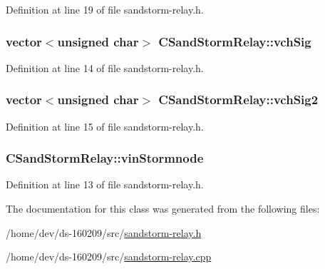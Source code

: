 Definition at line 19 of file sandstorm-\/relay.\+h.

\hypertarget{class_c_sand_storm_relay_a1e00147c64eddf291075d9a895894a98}{}
\subsubsection[{vch\+Sig}]{\setlength{\rightskip}{0pt plus 5cm}vector$<$unsigned char$>$ C\+Sand\+Storm\+Relay\+::vch\+Sig}\label{class_c_sand_storm_relay_a1e00147c64eddf291075d9a895894a98}


Definition at line 14 of file sandstorm-\/relay.\+h.

\hypertarget{class_c_sand_storm_relay_a5a9a84a315c1e649746bcbe1e5b85cb7}{}
\subsubsection[{vch\+Sig2}]{\setlength{\rightskip}{0pt plus 5cm}vector$<$unsigned char$>$ C\+Sand\+Storm\+Relay\+::vch\+Sig2}\label{class_c_sand_storm_relay_a5a9a84a315c1e649746bcbe1e5b85cb7}


Definition at line 15 of file sandstorm-\/relay.\+h.

\hypertarget{class_c_sand_storm_relay_ae9a99cafdc4ed5a56cfac7b141d0c98d}{}
\subsubsection[{vin\+Stormnode}]{ C\+Sand\+Storm\+Relay\+::vin\+Stormnode}\label{class_c_sand_storm_relay_ae9a99cafdc4ed5a56cfac7b141d0c98d}


Definition at line 13 of file sandstorm-\/relay.\+h.



The documentation for this class was generated from the following files\+:\begin{DoxyCompactItemize}
\item 
/home/dev/ds-\/160209/src/\hyperlink{sandstorm-relay_8h}{sandstorm-\/relay.\+h}\item 
/home/dev/ds-\/160209/src/\hyperlink{sandstorm-relay_8cpp}{sandstorm-\/relay.\+cpp}\end{DoxyCompactItemize}
